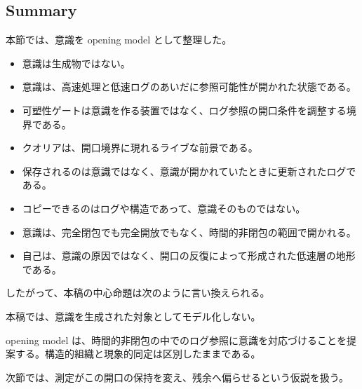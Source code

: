 \subsection{Summary}

本節では、意識を opening model として整理した。

\begin{itemize}
\item 意識は生成物ではない。
\item 意識は、高速処理と低速ログのあいだに参照可能性が開かれた状態である。
\item 可塑性ゲートは意識を作る装置ではなく、ログ参照の開口条件を調整する境界である。
\item クオリアは、開口境界に現れるライブな前景である。
\item 保存されるのは意識ではなく、意識が開かれていたときに更新されたログである。
\item コピーできるのはログや構造であって、意識そのものではない。
\item 意識は、完全閉包でも完全開放でもなく、時間的非閉包の範囲で開かれる。
\item 自己は、意識の原因ではなく、開口の反復によって形成された低速層の地形である。
\end{itemize}

したがって、本稿の中心命題は次のように言い換えられる。

本稿では、意識を生成された対象としてモデル化しない。

opening model は、時間的非閉包の中でのログ参照に意識を対応づけることを提案する。構造的組織と現象的同定は区別したままである。

次節では、測定がこの開口の保持を変え、残余へ偏らせるという仮説を扱う。
